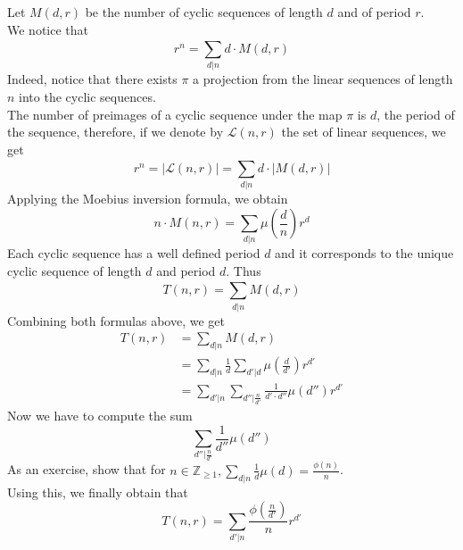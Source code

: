 \documentclass[../main.tex]{subfiles}
\begin{document}
Let $M( d,r) $ be the number of cyclic sequences of length $d$ and of period $r$.\\
We notice that
\[ 
	r^{n} = \sum_{d|n}^{ } d \cdot M( d,r) 
\]
Indeed, notice that there exists $\pi$ a projection from the linear sequences of length $n$ into the cyclic sequences.\\
The number of preimages of a cyclic sequence under the map $\pi$ is $d$, the period of the sequence, therefore, if we denote by $ \mathcal{L} ( n,r)   $ the set of linear sequences, we get
\[ 
	r^{n}=| \mathcal{L} ( n,r) | = \sum_{d|n}^{ } d \cdot | M( d,r) |
\]
Applying the Moebius inversion formula, we obtain
\[ 
	n \cdot M( n,r)  = \sum_{d|n}^{ } \mu ( \frac{d}{n}) r^{d}
\]
Each cyclic sequence has a well defined period $d$ and it corresponds to the unique cyclic sequence of length $d$ and period $d$.
Thus
\[ 
	T( n,r)  = \sum_{d|n}^{ } M( d,r) 
\]
Combining both formulas above, we get
\begin{align*}
	T( n,r) &= \sum_{d|n}^{ } M( d,r) \\
		&= \sum_{d|n}^{ } \frac{1}{d} \sum_{d'|d}^{ } \mu( \frac{d}{d'}) r^{d'}\\
		&= \sum_{d'|n}^{ } \sum_{d''| \frac{n}{d'}}^{ } \frac{1}{d'\cdot d''} \mu( d'') r^{d'}
\end{align*}
Now we have to compute the sum 
\[ 
	\sum_{d''| \frac{n}{d'}}^{ } \frac{1}{d''} \mu( d'') 
\]
As an exercise, show that for $n \in \mathbb{Z}_{ \geq 1}, \sum_{d|n}^{ } \frac{1}{d} \mu( d)  = \frac{\phi( n) }{n} $.\\
Using this, we finally obtain that
\[ 
	T( n,r) = \sum_{d'|n}^{ } \frac{\phi( \frac{n}{d'}) }{n} r^{d'}
\]
\end{document}
